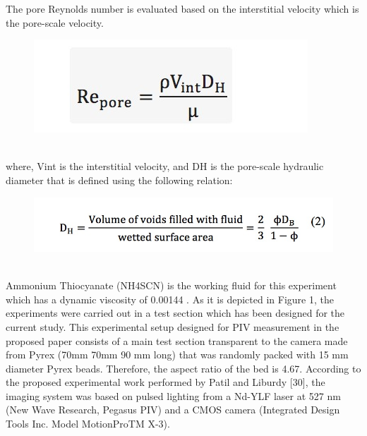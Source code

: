 \documentclass[letterpaper,12pt,titlepage,fleqn]{article}
\begin{document}
\begin{CJK}{UTF8}{gkai}
\begin{figure}[!h]
\end{figure}
The pore Reynolds number is evaluated based on the interstitial velocity which is the pore-scale velocity.
\begin{figure}[h]
	\centering
	\includegraphics[width= 0.3\linewidth ]{eq.jpg}	
\end{figure}
\\where, Vint is the interstitial velocity, and DH is the pore-scale  hydraulic diameter that is defined using the following relation: 
\begin{figure}[h]
	\centering
	\includegraphics[width= 0.5\linewidth ]{eq2.jpg}	
\end{figure}
\\Ammonium Thiocyanate (NH4SCN) is the working fluid for this experiment which has a dynamic viscosity of 0.00144  . As it is depicted in Figure 1, the experiments were carried out in a test section which has been designed for the current study. This experimental setup designed for PIV measurement in the proposed paper consists of a main test section transparent to the camera made from Pyrex (70mm  70mm  90 mm long) that was randomly packed with 15 mm diameter Pyrex beads. Therefore, the aspect ratio of the bed is 4.67. According to the proposed experimental work performed by Patil and Liburdy [30], the imaging system was based on pulsed lighting from a Nd-YLF laser at 527 nm (New Wave Research, Pegasus PIV) and a CMOS camera (Integrated Design Tools Inc. Model MotionProTM X-3).


\end{CJK}
\end{document}
